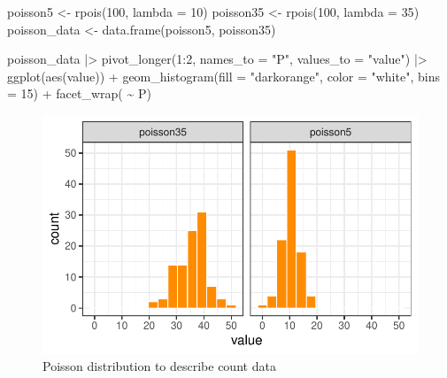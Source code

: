 \documentclass[
  letterpaper,
  DIV=11,
  numbers=noendperiod]{scrreprt}
\newenvironment{Shaded}{\begin{snugshade}}{\end{snugshade}}
\newcommand{\AttributeTok}[1]{\textcolor[rgb]{0.40,0.45,0.13}{#1}}
\newcommand{\DecValTok}[1]{\textcolor[rgb]{0.68,0.00,0.00}{#1}}
\newcommand{\FunctionTok}[1]{\textcolor[rgb]{0.28,0.35,0.67}{#1}}
\newcommand{\NormalTok}[1]{\textcolor[rgb]{0.00,0.23,0.31}{#1}}
\newcommand{\OtherTok}[1]{\textcolor[rgb]{0.00,0.23,0.31}{#1}}
\newcommand{\SpecialCharTok}[1]{\textcolor[rgb]{0.37,0.37,0.37}{#1}}
\newcommand{\StringTok}[1]{\textcolor[rgb]{0.13,0.47,0.30}{#1}}
\begin{document}
\begin{Shaded}
\begin{Highlighting}[]
\NormalTok{poisson5 }\OtherTok{\textless{}{-}} \FunctionTok{rpois}\NormalTok{(}\DecValTok{100}\NormalTok{, }\AttributeTok{lambda =} \DecValTok{10}\NormalTok{)}
\NormalTok{poisson35 }\OtherTok{\textless{}{-}} \FunctionTok{rpois}\NormalTok{(}\DecValTok{100}\NormalTok{, }\AttributeTok{lambda =} \DecValTok{35}\NormalTok{)}
\NormalTok{poisson\_data }\OtherTok{\textless{}{-}} \FunctionTok{data.frame}\NormalTok{(poisson5, poisson35)}
\end{Highlighting}
\end{Shaded}

\begin{Shaded}
\begin{Highlighting}[]
\NormalTok{poisson\_data }\SpecialCharTok{|\textgreater{}}
  \FunctionTok{pivot\_longer}\NormalTok{(}\DecValTok{1}\SpecialCharTok{:}\DecValTok{2}\NormalTok{, }\AttributeTok{names\_to =} \StringTok{"P"}\NormalTok{,}
               \AttributeTok{values\_to =} \StringTok{"value"}\NormalTok{) }\SpecialCharTok{|\textgreater{}}
  \FunctionTok{ggplot}\NormalTok{(}\FunctionTok{aes}\NormalTok{(value)) }\SpecialCharTok{+}
  \FunctionTok{geom\_histogram}\NormalTok{(}\AttributeTok{fill =} \StringTok{"darkorange"}\NormalTok{,}
                 \AttributeTok{color =} \StringTok{"white"}\NormalTok{,}
                 \AttributeTok{bins =} \DecValTok{15}\NormalTok{) }\SpecialCharTok{+}
  \FunctionTok{facet\_wrap}\NormalTok{( }\SpecialCharTok{\textasciitilde{}}\NormalTok{ P) }
\end{Highlighting}
\end{Shaded}

\begin{figure}[H]

{\centering \includegraphics{data-terminology_files/figure-pdf/fig-poisson-1.pdf}

}

\caption{\label{fig-poisson}Poisson distribution to describe count data}

\end{figure}
\end{document}

